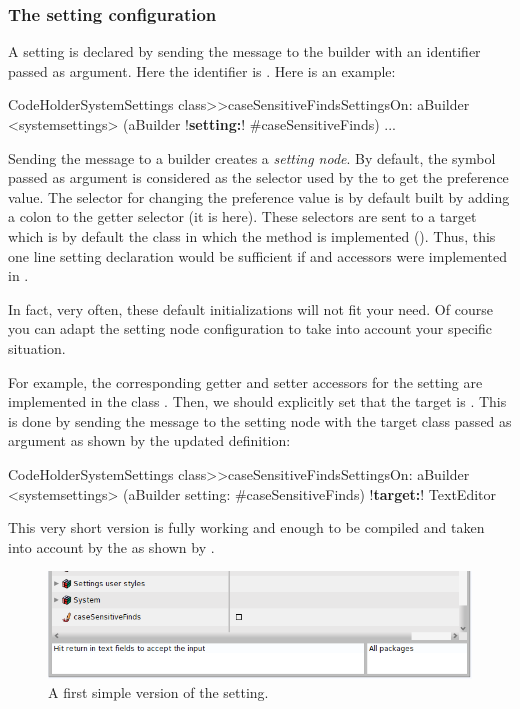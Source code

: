 \documentclass[a4paper,10pt,twoside]{book}
\begin{document}
\subsubsection{The setting configuration}
A setting is declared by sending the message  to the builder with an identifier passed as argument. Here the identifier is . Here is an example: 
\begin{code}{}
CodeHolderSystemSettings class>>caseSensitiveFindsSettingsOn: aBuilder
	<systemsettings>
	(aBuilder !\textbf{setting:}! #caseSensitiveFinds) 
    ...
\end{code}



Sending the message  to a builder creates a \textit{setting node}.
By default, the symbol passed as argument is considered as the selector used by the \setbrowser to get the preference value. The selector for changing the preference value is by default built by adding a colon to the getter selector (\ie it is  here).
These selectors are sent to a target which is by default the class in which the method is implemented (\ie {}). Thus, this one line setting declaration would be sufficient if   and  accessors were implemented in . 

In fact, very often, these default initializations will not fit your need. Of course you can adapt the setting node configuration to take into account your specific situation. 

For example,  the corresponding getter and setter accessors for the  setting are implemented in the class . Then, we should explicitly set that the target is . This is done by sending the message  to the setting node with the target class  passed as argument as shown by the updated definition: 
\begin{code}{}
CodeHolderSystemSettings class>>caseSensitiveFindsSettingsOn: aBuilder
	<systemsettings>
	(aBuilder setting: #caseSensitiveFinds) 
		 !\textbf{target:}! TextEditor
\end{code}

This very short version is fully working and enough to be compiled and taken into account by the \setbrowser as shown by .

\begin{figure}[tbh]
\begin{center}
\includegraphics[scale=0.4]{caseSensitiveFinds_setting_declaration2}
\caption{A first simple version of the  setting.}
\end{center}
\end{figure}
\end{document}
